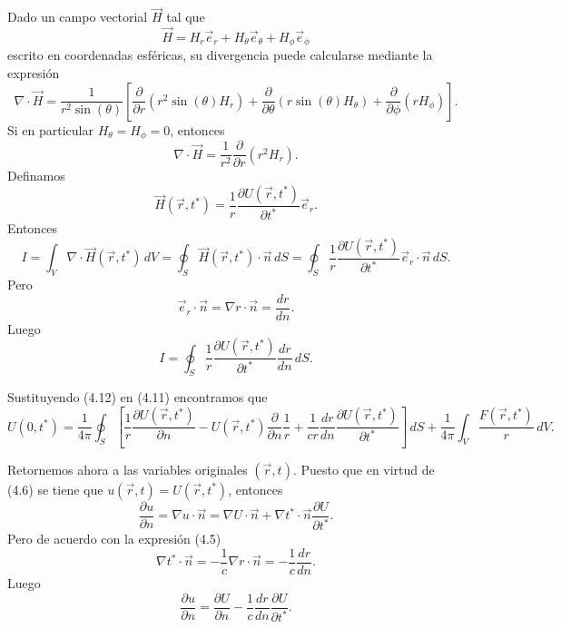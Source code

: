 \documentclass[12pt,a4paper]{book}
\begin{document}
Dado un campo vectorial $\vec{H}$ tal que
\begin{equation}
\vec{H} = H_r \vec{e}_r + H_\theta \vec{e}_\theta + H_\phi \vec{e}_\phi
\end{equation}
escrito en coordenadas esféricas, su divergencia puede calcularse mediante la expresión
\begin{equation}
\nabla \cdot \vec{H} = \frac{1}{r^2 \sin(\theta)}\left[\frac{\partial}{\partial r}(r^2 \sin(\theta) H_r) + \frac{\partial}{\partial \theta}(r \sin(\theta) H_\theta) + \frac{\partial}{\partial \phi}(r H_\phi)\right].
\end{equation}
Si en particular $H_\theta = H_\phi = 0$, entonces
\begin{equation}
\nabla \cdot \vec{H} = \frac{1}{r^2}\frac{\partial}{\partial r}(r^2 H_r).
\end{equation}
Definamos
\begin{equation}
\vec{H}(\vec{r}, t^*) = \frac{1}{r}\frac{\partial U(\vec{r}, t^*)}{\partial t^*}\vec{e}_r.
\end{equation}
Entonces
\begin{equation}
I = \int_V \nabla \cdot \vec{H}(\vec{r}, t^*)\,dV = \oint_S \vec{H}(\vec{r}, t^*) \cdot \vec{n}\,dS = \oint_S \frac{1}{r}\frac{\partial U(\vec{r}, t^*)}{\partial t^*}\vec{e}_r \cdot \vec{n}\,dS.
\end{equation}
Pero
\begin{equation}
\vec{e}_r \cdot \vec{n} = \nabla r \cdot \vec{n} = \frac{dr}{dn}.
\end{equation}
Luego
\begin{equation}
I = \oint_S \frac{1}{r}\frac{\partial U(\vec{r}, t^*)}{\partial t^*}\frac{dr}{dn}\,dS.
\end{equation}

Sustituyendo (4.12) en (4.11) encontramos que
\begin{equation}
U(0, t^*) = \frac{1}{4\pi}\oint_S \left[\frac{1}{r}\frac{\partial U(\vec{r}, t^*)}{\partial n} - U(\vec{r}, t^*)\frac{\partial}{\partial n}\frac{1}{r} + \frac{1}{cr}\frac{dr}{dn}\frac{\partial U(\vec{r}, t^*)}{\partial t^*}\right]\,dS + \frac{1}{4\pi}\int_V \frac{F(\vec{r}, t^*)}{r}\,dV.
\end{equation}

Retornemos ahora a las variables originales $(\vec{r}, t)$. Puesto que en virtud de (4.6) se tiene que $u(\vec{r}, t) = U(\vec{r}, t^*)$, entonces
\begin{equation}
\frac{\partial u}{\partial n} = \nabla u \cdot \vec{n} = \nabla U \cdot \vec{n} + \nabla t^* \cdot \vec{n}\frac{\partial U}{\partial t^*}.
\end{equation}
Pero de acuerdo con la expresión (4.5)
\begin{equation}
\nabla t^* \cdot \vec{n} = -\frac{1}{c}\nabla r \cdot \vec{n} = -\frac{1}{c}\frac{dr}{dn}.
\end{equation}
Luego
\begin{equation}
\frac{\partial u}{\partial n} = \frac{\partial U}{\partial n} - \frac{1}{c}\frac{dr}{dn}\frac{\partial U}{\partial t^*}.
\end{equation}
\end{document}

